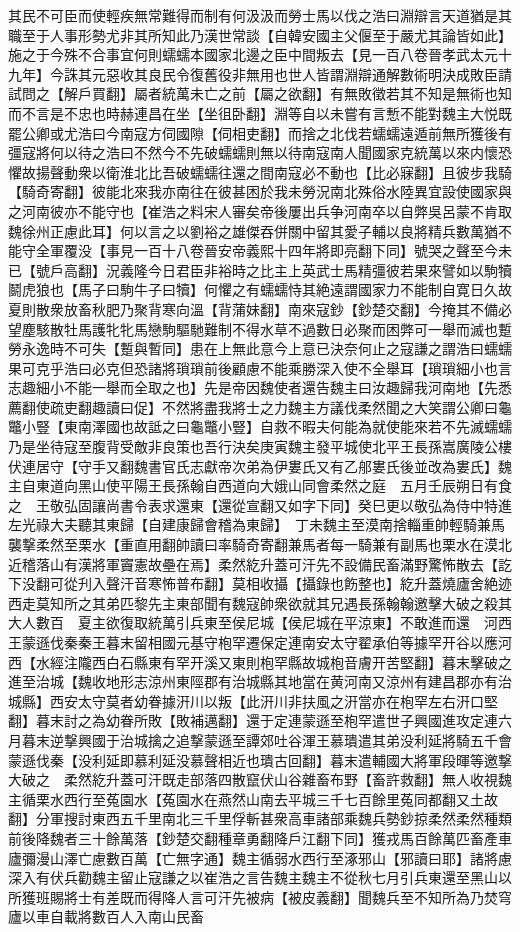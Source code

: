 其民不可臣而使輕疾無常難得而制有何汲汲而勞士馬以伐之浩曰淵辯言天道猶是其職至于人事形勢尤非其所知此乃漢世常談【自韓安國主父偃至于嚴尤其論皆如此】施之于今殊不合事宜何則蠕蠕本國家北邊之臣中間叛去【見一百八卷晉孝武太元十九年】今誅其元惡收其良民令復舊役非無用也世人皆謂淵辯通解數術明決成敗臣請試問之【解戶買翻】屬者統萬未亡之前【屬之欲翻】有無敗徵若其不知是無術也知而不言是不忠也時赫連昌在坐【坐徂卧翻】淵等自以未嘗有言慙不能對魏主大悦既罷公卿或尤浩曰今南寇方伺國隙【伺相吏翻】而捨之北伐若蠕蠕遠遁前無所獲後有彊寇將何以待之浩曰不然今不先破蠕蠕則無以待南寇南人聞國家克統萬以來内懷恐懼故揚聲動衆以衛淮北比吾破蠕蠕往還之間南寇必不動也【比必寐翻】且彼步我騎【騎奇寄翻】彼能北來我亦南往在彼甚困於我未勞況南北殊俗水陸異宜設使國家與之河南彼亦不能守也【崔浩之料宋人審矣帝後屢出兵争河南卒以自弊吳呂蒙不肯取魏徐州正慮此耳】何以言之以劉裕之雄傑吞併關中留其愛子輔以良將精兵數萬猶不能守全軍覆没【事見一百十八卷晉安帝義熙十四年將即亮翻下同】號哭之聲至今未已【號戶高翻】況義隆今日君臣非裕時之比主上英武士馬精彊彼若果來譬如以駒犢鬬虎狼也【馬子曰駒牛子曰犢】何懼之有蠕蠕恃其絶遠謂國家力不能制自寛日久故夏則散衆放畜秋肥乃聚背寒向溫【背蒲妹翻】南來寇鈔【鈔楚交翻】今掩其不備必望塵駭散牡馬護牝牝馬戀駒驅馳難制不得水草不過數日必聚而困弊可一舉而滅也蹔勞永逸時不可失【蹔與暫同】患在上無此意今上意已決奈何止之寇謙之謂浩曰蠕蠕果可克乎浩曰必克但恐諸將瑣瑣前後顧慮不能乘勝深入使不全舉耳【瑣瑣細小也言志趣細小不能一舉而全取之也】先是帝因魏使者還告魏主曰汝趣歸我河南地【先悉薦翻使疏吏翻趣讀曰促】不然將盡我將士之力魏主方議伐柔然聞之大笑謂公卿曰龜鼈小豎【東南澤國也故詆之曰龜鼈小豎】自救不暇夫何能為就使能來若不先滅蠕蠕乃是坐待寇至腹背受敵非良策也吾行決矣庚寅魏主發平城使北平王長孫嵩廣陵公樓伏連居守【守手又翻魏書官氏志獻帝次弟為伊婁氏又有乙郍婁氏後並改為婁氏】魏主自東道向黑山使平陽王長孫翰自西道向大娥山同會柔然之庭　五月壬辰朔日有食之　王敬弘固讓尚書令表求還東【還從宣翻又如字下同】癸巳更以敬弘為侍中特進左光祿大夫聽其東歸【自建康歸會稽為東歸】　丁未魏主至漠南捨輜重帥輕騎兼馬襲撃柔然至栗水【重直用翻帥讀曰率騎奇寄翻兼馬者每一騎兼有副馬也栗水在漠北近稽落山有漢將軍竇憲故壘在焉】柔然紇升蓋可汗先不設備民畜滿野驚怖散去【訖下没翻可從刋入聲汗音寒怖普布翻】莫相收攝【攝錄也飭整也】紇升蓋燒廬舍絶迹西走莫知所之其弟匹黎先主東部聞有魏寇帥衆欲就其兄遇長孫翰翰邀擊大破之殺其大人數百　夏主欲復取統萬引兵東至侯尼城【侯尼城在平涼東】不敢進而還　河西王蒙遜伐秦秦王暮末留相國元基守枹罕遷保定連南安太守翟承伯等據罕开谷以應河西【水經注隴西白石縣東有罕开溪又東則枹罕縣故城枹音膚开苦堅翻】暮末擊破之進至治城【魏收地形志涼州東陘郡有治城縣其地當在黄河南又涼州有建昌郡亦有治城縣】西安太守莫者幼眷據汧川以叛【此汧川非扶風之汧當亦在枹罕左右汧口堅翻】暮末討之為幼眷所敗【敗補邁翻】還于定連蒙遜至枹罕遣世子興國進攻定連六月暮末逆撃興國于治城擒之追撃蒙遜至譚郊吐谷渾王慕璝遣其弟没利延將騎五千會蒙遜伐秦【没利延即慕利延没慕聲相近也璝古回翻】暮末遣輔國大將軍段暉等邀撃大破之　柔然紇升蓋可汗既走部落四散竄伏山谷雜畜布野【畜許救翻】無人收視魏主循栗水西行至菟園水【菟園水在燕然山南去平城三千七百餘里菟同都翻又土故翻】分軍搜討東西五千里南北三千里俘斬甚衆高車諸部乘魏兵勢鈔掠柔然柔然種類前後降魏者三十餘萬落【鈔楚交翻種章勇翻降戶江翻下同】獲戎馬百餘萬匹畜產車廬彌漫山澤亡慮數百萬【亡無字通】魏主循弱水西行至涿邪山【邪讀曰耶】諸將慮深入有伏兵勸魏主留止寇謙之以崔浩之言告魏主魏主不從秋七月引兵東還至黑山以所獲班賜將士有差既而得降人言可汗先被病【被皮義翻】聞魏兵至不知所為乃焚穹廬以車自載將數百人入南山民畜